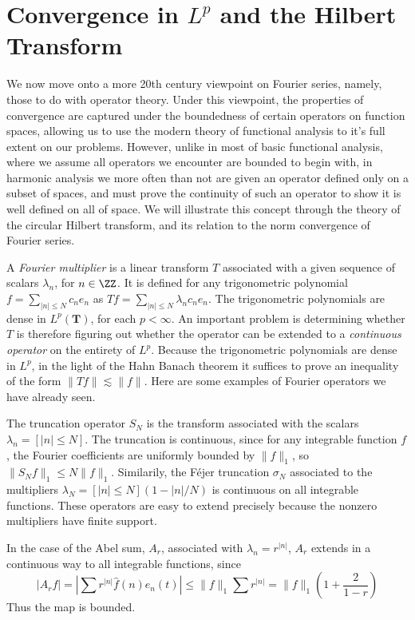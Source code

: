 \section{Convergence in $L^p$ and the Hilbert Transform}

We now move onto a more 20th century viewpoint on Fourier series, namely, those to do with operator theory. Under this viewpoint, the properties of convergence are captured under the boundedness of certain operators on function spaces, allowing us to use the modern theory of functional analysis to it's full extent on our problems. However, unlike in most of basic functional analysis, where we assume all operators we encounter are bounded to begin with, in harmonic analysis we more often than not are given an operator defined only on a subset of spaces, and must prove the continuity of such an operator to show it is well defined on all of space. We will illustrate this concept through the theory of the circular Hilbert transform, and its relation to the norm convergence of Fourier series.

A \emph{Fourier multiplier} is a linear transform $T$ associated with a given sequence of scalars $\lambda_n$, for $n \in \ZZ$. It is defined for any trigonometric polynomial $f = \sum_{|n| \leq N} c_n e_n$ as $Tf = \sum_{|n| \leq N} \lambda_n c_n e_n$. The trigonometric polynomials are dense in $L^p(\mathbf{T})$, for each $p < \infty$. An important problem is determining whether $T$ is therefore figuring out whether the operator can be extended to a {\it continuous operator} on the entirety of $L^p$. Because the trigonometric polynomials are dense in $L^p$, in the light of the Hahn Banach theorem it suffices to prove an inequality of the form $\| Tf \| \lesssim \| f \|$. Here are some examples of Fourier operators we have already seen.

\begin{example}
    The truncation operator $S_N$ is the transform associated with the scalars $\lambda_n = [|n| \leq N]$. The truncation is continuous, since for any integrable function $f$, the Fourier coefficients are uniformly bounded by $\| f \|_1$, so $\| S_N f \|_1 \leq N \| f \|_1$. Similarily, the F\'{e}jer truncation $\sigma_N$ associated to the multipliers $\lambda_N = [|n| \leq N](1 - |n|/N)$ is continuous on all integrable functions. These operators are easy to extend precisely because the nonzero multipliers have finite support.
\end{example}

\begin{example}
    In the case of the Abel sum, $A_r$, associated with $\lambda_n = r^{|n|}$, $A_r$ extends in a continuous way to all integrable functions, since
    \[ |A_r f| = \left| \sum r^{|n|} \widehat{f}(n) e_n(t) \right| \leq \| f \|_1 \sum r^{|n|} = \| f \|_1 \left( 1 + \frac{2}{1 - r} \right) \]
    Thus the map is bounded.
\end{example}

